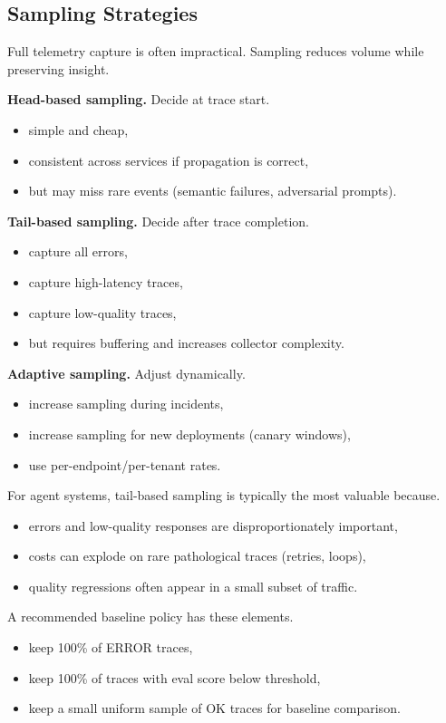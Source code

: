 \subsection{Sampling Strategies}

Full telemetry capture is often impractical. Sampling reduces volume while preserving insight.

\textbf{Head-based sampling.} Decide at trace start.
\begin{itemize}
\item simple and cheap,
\item consistent across services if propagation is correct,
\item but may miss rare events (semantic failures, adversarial prompts).
\end{itemize}

\textbf{Tail-based sampling.} Decide after trace completion.
\begin{itemize}
\item capture all errors,
\item capture high-latency traces,
\item capture low-quality traces,
\item but requires buffering and increases collector complexity.
\end{itemize}

\textbf{Adaptive sampling.} Adjust dynamically.
\begin{itemize}
\item increase sampling during incidents,
\item increase sampling for new deployments (canary windows),
\item use per-endpoint/per-tenant rates.
\end{itemize}

For agent systems, tail-based sampling is typically the most valuable because.
\begin{itemize}
\item errors and low-quality responses are disproportionately important,
\item costs can explode on rare pathological traces (retries, loops),
\item quality regressions often appear in a small subset of traffic.
\end{itemize}

A recommended baseline policy has these elements.
\begin{itemize}
\item keep 100\% of ERROR traces,
\item keep 100\% of traces with eval score below threshold,
\item keep a small uniform sample of OK traces for baseline comparison.
\end{itemize}

